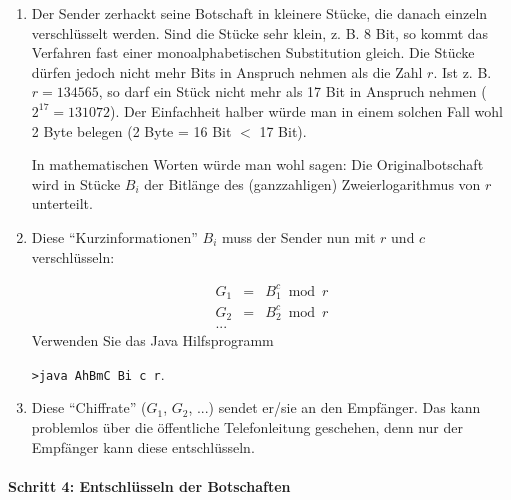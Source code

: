 \begin{enumerate}[label={\alph*)}]

 \item Der Sender zerhackt seine Botschaft in kleinere Stücke, die
danach einzeln verschlüsselt werden. Sind die Stücke sehr klein,
z. B. 8 Bit, so kommt das Verfahren fast einer monoalphabetischen
Substitution gleich. Die Stücke dürfen jedoch nicht mehr Bits in
Anspruch nehmen als die Zahl \(r\). Ist z. B. \(r = 134565\), so darf ein
Stück nicht mehr als 17 Bit in Anspruch nehmen (\(2^{17} =
131072\)). Der Einfachheit halber würde man in einem solchen Fall wohl
2 Byte belegen (2 Byte = 16 Bit \(<\) 17 Bit).

In mathematischen Worten würde man wohl sagen: Die Originalbotschaft
wird in Stücke \(B_i\) der Bitlänge des (ganzzahligen) Zweierlogarithmus von
\(r\) unterteilt.


\item Diese ``Kurzinformationen'' \(B_i\) muss der Sender nun mit \(r\) und \(c\) verschlüsseln:

\begin{eqnarray*}
	G_1 &=& B_1^c \bmod r \\
	G_2 &=& B_2^c \bmod r \\
	...
\end{eqnarray*}
Verwenden Sie das Java Hilfsprogramm

\texttt{>java AhBmC Bi c r}.

\item Diese ``Chiffrate'' (\(G_1\), \(G_2\), ...) sendet er/sie an den
Empfänger. Das kann problemlos über die öffentliche Telefonleitung
geschehen, denn nur der Empfänger kann diese entschlüsseln.

\end{enumerate}


\paragraph*{Schritt 4: Entschlüsseln der Botschaften}

